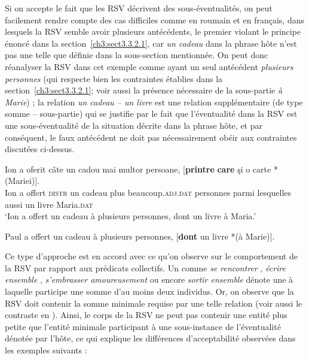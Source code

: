 Si on accepte le fait que les RSV décrivent des sous-éventualités, on peut facilement rendre compte des cas difficiles comme  en roumain et  en français, dans lesquels la RSV semble avoir plusieurs antécédents, le premier violant le principe énoncé dans la section~\ref{ch3:sect3.3.2.1}, car \textit{un cadeau} dans la phrase hôte n’est pas une  telle que définie dans la sous-section mentionnée. On peut donc réanalyser la RSV dans cet exemple comme ayant un seul antécédent \textit{plusieurs personnes} (qui respecte bien les contraintes établies dans la section~\ref{ch3:sect3.3.2.1}; voir aussi la présence nécessaire de la sous-partie \textit{à Marie}) ; la relation \textit{un cadeau – un livre} est une relation supplémentaire (de type somme – sous-partie) qui se justifie par le fait que l’éventualité dans la RSV est une sous-éventualité de la situation décrite dans la phrase hôte, et par conséquent, le faux antécédent ne doit pas nécessairement obéir aux contraintes discutées ci-dessus. 

\ea \label{ch3:ex79} 
\gll Ion  a  oferit  câte  un  cadou  mai  multor  persoane,  [\textbf{printre} \textbf{care}  şi  o  carte  *(Mariei)]. \\
Ion  a  offert  \textsc{distr}  un  cadeau  plus  beaucoup.\textsc{adj.dat}  personnes  parmi 
lesquelles  aussi  un  livre  Maria.\textsc{dat} \\
\glt ‘Ion a offert un cadeau à plusieurs personnes, dont un livre à Maria.’ 
\z 

\ea \label{ch3:ex80}
Paul a offert un cadeau à plusieurs personnes, [\textbf{dont} un livre *(à Marie)]. 
\z

Ce type d’approche est en accord avec ce qu’on observe sur le comportement de la RSV par rapport aux prédicats collectifs. Un  comme \textit{se rencontrer} , \textit{écrire ensemble} , \textit{s’embrasser amoureusement}  ou encore \textit{sortir ensemble}  dénote une  à laquelle participe une somme d’au moins deux individus. Or, on observe que la RSV doit contenir la somme minimale requise par une telle relation (voir aussi le contraste en ). Ainsi, le corps de la RSV ne peut pas contenir une entité plus petite que l’entité minimale participant à une sous-instance de l’éventualité dénotée par l’hôte, ce qui explique les différences d’acceptabilité observées dans les exemples suivants :

